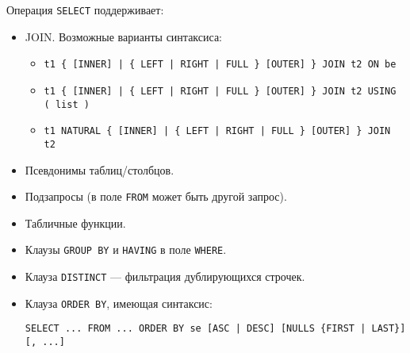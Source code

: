 \documentclass[a4paper,12pt,notitlepage,headsepline,pdftex]{scrartcl}
\begin{document}
    Операция \texttt{SELECT} поддерживает:
    \begin{itemize}
      \item JOIN.
        Возможные варианты синтаксиса:
        \begin{itemize}
          \item \verb't1 { [INNER] | { LEFT | RIGHT | FULL } [OUTER] } JOIN t2 ON be'
          \item \verb't1 { [INNER] | { LEFT | RIGHT | FULL } [OUTER] } JOIN t2 USING ( list )'
          \item \verb't1 NATURAL { [INNER] | { LEFT | RIGHT | FULL } [OUTER] } JOIN t2'
        \end{itemize}
      \item Псевдонимы таблиц/столбцов.
      \item Подзапросы (в поле \verb'FROM' может быть другой запрос).
      \item Табличные функции.
      \item Клаузы \verb'GROUP BY' и \verb'HAVING' в поле \verb'WHERE'.
      \item Клауза \verb'DISTINCT' --- фильтрация дублирующихся строчек.
      \item Клауза \verb'ORDER BY', имеющая синтаксис:

        \verb'SELECT ... FROM ... ORDER BY se [ASC | DESC] [NULLS {FIRST | LAST}] [, ...]'
    \end{itemize}
\end{document}

